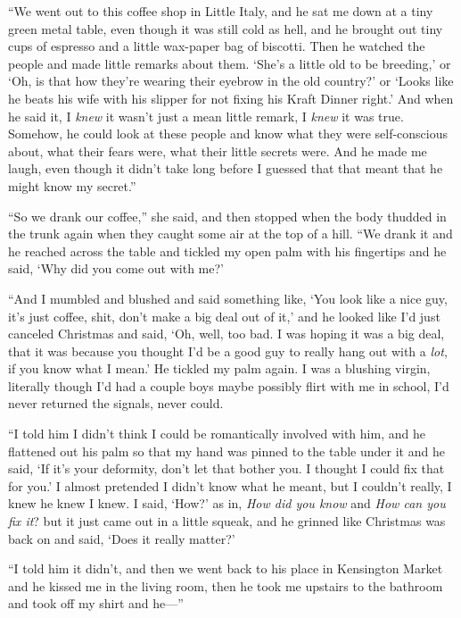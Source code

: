``We went out to this coffee shop in Little Italy, and he sat me down
at a tiny green metal table, even though it was still cold as hell,
and he brought out tiny cups of espresso and a little wax-paper bag of
biscotti.  Then he watched the people and made little remarks about
them.  `She's a little old to be breeding,' or `Oh, is that how
they're wearing their eyebrow in the old country?' or `Looks like he
beats his wife with his slipper for not fixing his Kraft Dinner
right.' And when he said it, I \textit{knew} it wasn't just a mean
little remark, I \textit{knew} it was true.  Somehow, he could look at
these people and know what they were self-conscious about, what their
fears were, what their little secrets were.  And he made me laugh,
even though it didn't take long before I guessed that that meant that
he might know my secret.''

``So we drank our coffee,'' she said, and then stopped when the body
thudded in the trunk again when they caught some air at the top of a
hill.  ``We drank it and he reached across the table and tickled my
open palm with his fingertips and he said, `Why did you come out with
me?'

``And I mumbled and blushed and said something like, `You look like a
nice guy, it's just coffee, shit, don't make a big deal out of it,'
and he looked like I'd just canceled Christmas and said, `Oh, well,
too bad.  I was hoping it was a big deal, that it was because you
thought I'd be a good guy to really hang out with a \textit{lot}, if
you know what I mean.' He tickled my palm again.  I was a blushing
virgin, literally though I'd had a couple boys maybe possibly flirt
with me in school, I'd never returned the signals, never could.

``I told him I didn't think I could be romantically involved with him,
and he flattened out his palm so that my hand was pinned to the table
under it and he said, `If it's your deformity, don't let that bother
you.  I thought I could fix that for you.' I almost pretended I didn't
know what he meant, but I couldn't really, I knew he knew I knew.  I
said, `How?' as in, \textit{How did you know} and \textit{How can you
fix it}?  but it just came out in a little squeak, and he grinned like
Christmas was back on and said, `Does it really matter?'

``I told him it didn't, and then we went back to his place in
Kensington Market and he kissed me in the living room, then he took me
upstairs to the bathroom and took off my shirt and he---''

